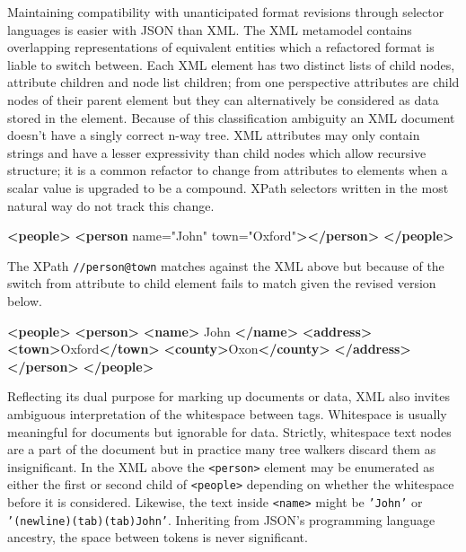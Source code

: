 \documentclass[12pt, ]{article}
\newenvironment{Shaded}{}{}
\newcommand{\KeywordTok}[1]{\textcolor[rgb]{0.00,0.44,0.13}{\textbf{{#1}}}}
\newcommand{\StringTok}[1]{\textcolor[rgb]{0.25,0.44,0.63}{{#1}}}
\newcommand{\OtherTok}[1]{\textcolor[rgb]{0.00,0.44,0.13}{{#1}}}
\newcommand{\NormalTok}[1]{{#1}}
\begin{document}
Maintaining compatibility with unanticipated format revisions through
selector languages is easier with JSON than XML. The XML metamodel
contains overlapping representations of equivalent entities which a
refactored format is liable to switch between. Each XML element has two
distinct lists of child nodes, attribute children and node list
children; from one perspective attributes are child nodes of their
parent element but they can alternatively be considered as data stored
in the element. Because of this classification ambiguity an XML document
doesn't have a singly correct n-way tree. XML attributes may only
contain strings and have a lesser expressivity than child nodes which
allow recursive structure; it is a common refactor to change from
attributes to elements when a scalar value is upgraded to be a compound.
XPath selectors written in the most natural way do not track this
change.

\begin{Shaded}
\begin{Highlighting}[]
\KeywordTok{<people>}
   \KeywordTok{<person}\OtherTok{ name=}\StringTok{"John"}\OtherTok{ town=}\StringTok{"Oxford"}\KeywordTok{></person>}
\KeywordTok{</people>}
\end{Highlighting}
\end{Shaded}

The XPath \texttt{//person@town} matches against the XML above but
because of the switch from attribute to child element fails to match
given the revised version below.

\begin{Shaded}
\begin{Highlighting}[]
\KeywordTok{<people>}
   \KeywordTok{<person>}
      \KeywordTok{<name>}
         \NormalTok{John}
      \KeywordTok{</name>}
      \KeywordTok{<address>}
         \KeywordTok{<town>}\NormalTok{Oxford}\KeywordTok{</town>} \KeywordTok{<county>}\NormalTok{Oxon}\KeywordTok{</county>}
      \KeywordTok{</address>}
   \KeywordTok{</person>}
\KeywordTok{</people>}
\end{Highlighting}
\end{Shaded}

Reflecting its dual purpose for marking up documents or data, XML also
invites ambiguous interpretation of the whitespace between tags.
Whitespace is usually meaningful for documents but ignorable for data.
Strictly, whitespace text nodes are a part of the document but in
practice many tree walkers discard them as insignificant. In the XML
above the \texttt{\textless{}person\textgreater{}} element may be
enumerated as either the first or second child of
\texttt{\textless{}people\textgreater{}} depending on whether the
whitespace before it is considered. Likewise, the text inside
\texttt{\textless{}name\textgreater{}} might be \texttt{'John'} or
\texttt{'(newline)(tab)(tab)John'}. Inheriting from JSON's programming
language ancestry, the space between tokens is never significant.
\end{document}
